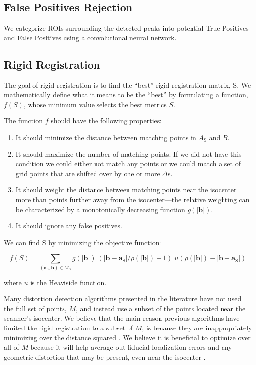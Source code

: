 \documentclass[12pt]{article}
\begin{document}
\subsection{False Positives Rejection}

We categorize ROIs surrounding the detected peaks into potential True Positives and False Positives using a convolutional neural network.

\subsection{Rigid Registration}

The goal of rigid registration is to find the ``best'' rigid registration matrix, $\textrm{S}$.  We mathematically define what it means to be the ``best'' by formulating a function, $f(S)$, whose minimum value selects the best metrics $S$.

The function $f$ should have the following properties:

\begin{enumerate}
\item It should minimize the distance between matching points in $A_\mathrm{S}$ and $B$.
\item It should maximize the number of matching points.  If we did not have this condition we could either not match any points or we could match a set of grid points that are shifted over by one or more $\Delta$s.
\item It should weight the distance between matching points near the isocenter more than points further away from the isocenter---the relative weighting can be characterized by a monotonically decreasing function $g(|\mathbf{b}|)$.
\item It should ignore any false positives.
\end{enumerate}

We can find $\mathrm{S}$ by minimizing the objective function:

\begin{equation*}
f(S) =
\sum_{(\textbf{a}_\textrm{S}, \textbf{b}) \in M_\textrm{S}} g(\left|\mathbf{b}\right|)
\;
(\left|\mathbf{b} - \mathbf{a}_\textrm{S}\right|/\rho(|\mathbf{b}|) - 1)
\;
u(\rho(|\mathbf{b}|) - \left|\mathbf{b} - \mathbf{a}_\textrm{S}\right|)
\end{equation*}

where $u$ is the Heaviside function.

Many distortion detection algorithms presented in the literature have not used the full set of points, $M$, and instead use a subset of the points located near the scanner's isocenter.  We believe that the main reason previous algorithms have limited the rigid registration to a subset of $M$, is because they are inappropriately minimizing over the distance squared \cite{wang2005}.  We believe it is beneficial to optimize over all of $M$ because it will help average out fiducial localization errors and any geometric distortion that may be present, even near the isocenter \cite{baldwin2007}.
\end{document}
